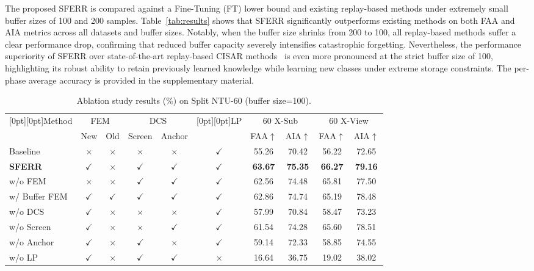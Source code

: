 \documentclass[journal]{IEEEtran}
\begin{document}
The proposed SFERR is compared against a Fine-Tuning (FT) lower bound and existing replay-based methods under extremely small buffer sizes of 100 and 200 samples. 
Table~\ref{tab:results} shows that SFERR significantly outperforms existing methods on both FAA and AIA metrics across all datasets and buffer sizes.
Notably, when the buffer size shrinks from 200 to 100, all replay-based methods suffer a clear performance drop, confirming that reduced buffer capacity severely intensifies catastrophic forgetting.
Nevertheless, the performance superiority of SFERR over state-of-the-art replay-based CISAR methods~\cite{boschini2023,mosconi2024} is even more pronounced at the strict buffer size of 100, highlighting its robust ability to retain previously learned knowledge while learning new classes under extreme storage constraints.
The per-phase average accuracy is provided in the supplementary material.

\begin{table}[t]
\centering
\caption{Ablation study results (\%) on Split NTU-60 (buffer size=100).}
\vskip -5pt
\label{tab:ablation}
\setlength{\tabcolsep}{2.2pt}
\renewcommand{\arraystretch}{0.95}
\providecommand{\yes}{$\checkmark$}
\providecommand{\no}{$\times$}

\begin{tabular}{@{}l ccccc cc cc@{}}
\hline
\raisebox{-0.5\baselineskip}[0pt][0pt]{Method}
& \multicolumn{2}{c}{FEM} & \multicolumn{2}{c}{DCS}
& \raisebox{-0.5\baselineskip}[0pt][0pt]{LP}
& \multicolumn{2}{c}{60 X-Sub}
& \multicolumn{2}{c}{60 X-View} \\
\cline{2-10}
& New & Old & Screen & Anchor &
& FAA$\uparrow$ & AIA$\uparrow$ & FAA$\uparrow$ & AIA$\uparrow$ \\
\hline
Baseline
& \no & \no & \no & \no & \yes
& 55.26 & 70.42 & 56.22 & 72.65 \\
\textbf{SFERR}
& \yes & \no & \yes & \yes & \yes
& \textbf{63.67} & \textbf{75.35} & \textbf{66.27} & \textbf{79.16} \\
\hline
w/o FEM
& \no & \no & \yes & \yes & \yes
& 62.56 & 74.48 & 65.81 & 77.50 \\
w/ Buffer FEM 
& \yes & \yes & \yes & \yes & \yes
& 62.86 & 74.74 & 65.19 & 78.48 \\
\hline
w/o DCS
& \yes & \no & \no & \no & \yes
& 57.99 & 70.84 & 58.47 & 73.23 \\
w/o Screen
& \yes & \no & \no & \yes &\yes
& 61.54 & 74.28 & 65.60 & 78.51 \\
w/o Anchor
& \yes & \no  & \yes & \no & \yes
& 59.14 & 72.33 & 58.85 & 74.55 \\
\hline
w/o LP
& \yes & \no & \yes & \yes & \no
& 16.64 & 36.75 & 19.02 & 38.02 \\
\hline
\end{tabular}
\vspace{-5pt}
\end{table}
\end{document}
